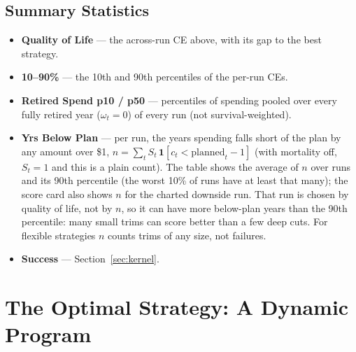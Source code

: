 \documentclass[11pt,letterpaper]{article}
\begin{document}
\subsection{Summary Statistics}
\label{sec:metrics}
\begin{itemize}
\setlength\itemsep{1pt}
\item \textbf{Quality of Life} --- the across-run CE above, with its gap to the best strategy.
\item \textbf{10--90\%} --- the 10th and 90th percentiles of the per-run CEs.
\item \textbf{Retired Spend p10 / p50} --- percentiles of spending pooled over every fully retired year ($\omega_t=0$) of every run (not survival-weighted).
\item \textbf{Yrs Below Plan} --- per run, the years spending falls short of the plan by any amount over \$1, $n = \sum_t S_t\,\mathbf{1}[c_t < \text{planned}_t - 1]$ (with mortality off, $S_t = 1$ and this is a plain count). The table shows the average of $n$ over runs and its 90th percentile (the worst 10\% of runs have at least that many); the score card also shows $n$ for the charted downside run. That run is chosen by quality of life, not by $n$, so it can have more below-plan years than the 90th percentile: many small trims can score better than a few deep cuts. For flexible strategies $n$ counts trims of any size, not failures.
\item \textbf{Success} --- Section~\ref{sec:kernel}.
\end{itemize}

\section{The Optimal Strategy: A Dynamic Program}
\label{sec:dp}
\end{document}
